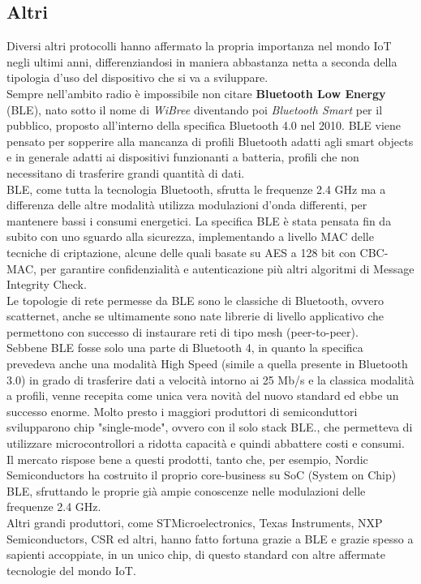 \subsection{Altri}
Diversi altri protocolli hanno affermato la propria importanza nel mondo IoT negli ultimi anni, differenziandosi in maniera abbastanza netta a seconda della tipologia d'uso del dispositivo che si va a sviluppare.
\\Sempre nell'ambito radio è impossibile non citare \textbf{Bluetooth Low Energy} (BLE), nato sotto il nome di \textit{WiBree} diventando poi \textit{Bluetooth Smart} per il pubblico, proposto all'interno della specifica Bluetooth 4.0 nel 2010. BLE viene pensato per sopperire alla mancanza di profili Bluetooth adatti agli smart objects e in generale adatti ai dispositivi funzionanti a batteria, profili che non necessitano di trasferire grandi quantità di dati.
\\BLE, come tutta la tecnologia Bluetooth, sfrutta le frequenze 2.4 GHz ma a differenza delle altre modalità utilizza modulazioni d'onda differenti, per mantenere bassi i consumi energetici. La specifica BLE è stata pensata fin da subito con uno sguardo alla sicurezza, implementando a livello MAC delle tecniche di criptazione, alcune delle quali basate su AES a 128 bit con CBC-MAC, per garantire confidenzialità e autenticazione più altri algoritmi di Message Integrity Check.\\Le topologie di rete permesse da BLE sono le classiche di Bluetooth, ovvero scatternet, anche se ultimamente sono nate librerie di livello applicativo che permettono con successo di instaurare reti di tipo mesh (peer-to-peer). \\Sebbene BLE fosse solo una parte di Bluetooth 4, in quanto la specifica prevedeva anche una modalità High Speed (simile a quella presente in Bluetooth 3.0) in grado di trasferire dati a velocità intorno ai 25 Mb/s e la classica modalità a profili, venne recepita come unica vera novità del nuovo standard ed ebbe un successo enorme. Molto presto i maggiori produttori di semiconduttori svilupparono chip "single-mode", ovvero con il solo stack BLE., che permetteva di utilizzare microcontrollori a ridotta capacità e quindi abbattere costi e consumi. Il mercato rispose bene a questi prodotti, tanto che, per esempio, Nordic Semiconductors ha costruito il proprio core-business su SoC (System on Chip) BLE, sfruttando le proprie già ampie conoscenze nelle modulazioni delle frequenze 2.4 GHz. \\Altri grandi produttori, come STMicroelectronics, Texas Instruments, NXP Semiconductors, CSR ed altri, hanno fatto fortuna grazie a BLE e grazie spesso a sapienti accoppiate, in un unico chip, di questo standard con altre affermate tecnologie del mondo IoT.

